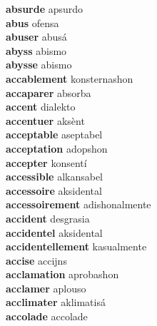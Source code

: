 \textbf{absurde } apsurdo \\
\textbf{abus } ofensa \\
\textbf{abuser } abusá \\
\textbf{abyss } abismo \\
\textbf{abysse } abismo \\
\textbf{accablement } konsternashon \\
\textbf{accaparer } absorba \\
\textbf{accent } dialekto \\
\textbf{accentuer } aksènt \\
\textbf{acceptable } aseptabel \\
\textbf{acceptation } adopshon \\
\textbf{accepter } konsentí \\
\textbf{accessible } alkansabel \\
\textbf{accessoire } aksidental \\
\textbf{accessoirement } adishonalmente \\
\textbf{accident } desgrasia \\
\textbf{accidentel } aksidental \\
\textbf{accidentellement } kasualmente \\
\textbf{accise } accijns \\
\textbf{acclamation } aprobashon \\
\textbf{acclamer } aplouso \\
\textbf{acclimater } aklimatisá \\
\textbf{accolade } accolade \\

